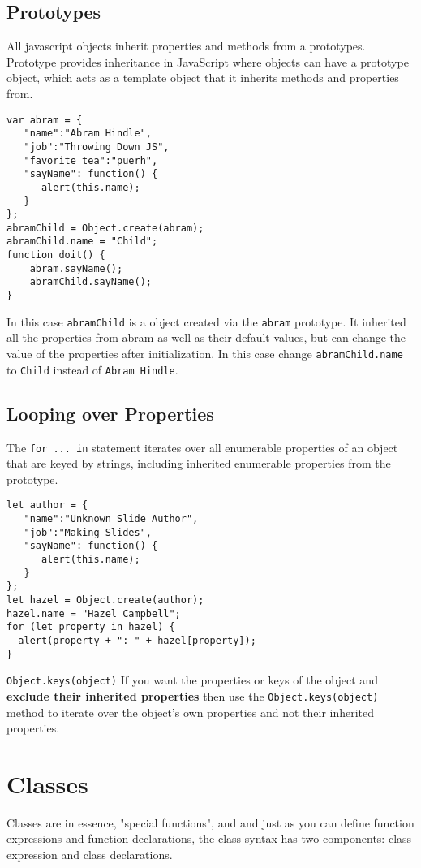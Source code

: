 \documentclass[../CMPUT-404-Notes.tex]{subfiles}
\begin{document}
\subsection{Prototypes}
All javascript objects inherit properties and methods from a prototypes.
Prototype provides inheritance in JavaScript where objects can have a prototype object, which acts as a template object that it inherits methods and properties from.
\begin{verbatim}
var abram = {
   "name":"Abram Hindle",
   "job":"Throwing Down JS",
   "favorite tea":"puerh",
   "sayName": function() {
      alert(this.name);
   }
};
abramChild = Object.create(abram);
abramChild.name = "Child";
function doit() {
    abram.sayName();
    abramChild.sayName();
}
\end{verbatim}
In this case \texttt{abramChild} is a object created via the \texttt{abram} prototype. It inherited all the properties from abram as well as their default values, but can change the value of the properties after initialization. In this case change \texttt{abramChild.name} to \texttt{Child} instead of \texttt{Abram Hindle}.

\subsection{Looping over Properties}

The \texttt{for ... in} statement iterates over all enumerable properties of an object that are keyed by strings, including inherited enumerable properties from the prototype. 

\begin{verbatim}
let author = {
   "name":"Unknown Slide Author",
   "job":"Making Slides",
   "sayName": function() {
      alert(this.name);
   }
};
let hazel = Object.create(author);
hazel.name = "Hazel Campbell";
for (let property in hazel) {
  alert(property + ": " + hazel[property]);
}
\end{verbatim}

\begin{DndSidebar}[color=PhbLightGreen]{ \texttt{Object.keys(object)} }
  If you want the properties or keys of the object and \textbf{exclude their inherited properties} then use the \texttt{Object.keys(object)} method to iterate over the object's own properties and not their inherited properties.  
\end{DndSidebar}
  
\section{Classes}
Classes are in essence, "special functions", and and just as you can define function expressions and function declarations, the class syntax has two components: class expression and class declarations.  
\end{document}
